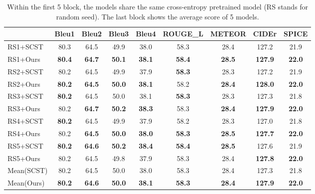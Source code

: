 \documentclass[11pt,a4paper]{article}
\begin{document}
\begin{table*}[htbp]\small
  \centering
    \begin{tabular}{lcccccccc}
          & \multicolumn{1}{l}{Bleu1} & \multicolumn{1}{l}{Bleu2} & \multicolumn{1}{l}{Bleu3} & \multicolumn{1}{l}{Bleu4} & \multicolumn{1}{l}{ROUGE\_L} & \multicolumn{1}{l}{METEOR} & \multicolumn{1}{l}{CIDEr} & \multicolumn{1}{l}{SPICE} \\
    \midrule
    RS1+SCST & 80.3  & 64.5  & 49.9  & 38.0  & 58.3  & 28.4  & 127.2 & 21.9 \\
    RS1+Ours & \textbf{80.4} & \textbf{64.7} & \textbf{50.1} & \textbf{38.1} & \textbf{58.4} & \textbf{28.5} & \textbf{127.9} & \textbf{22.0} \\
    \midrule
    RS2+SCST & 80.2  & 64.5  & 49.9  & 37.9  & \textbf{58.3} & 28.3  & 127.2 & 21.9 \\
    RS2+Ours & \textbf{80.2} & \textbf{64.5} & \textbf{50.0} & \textbf{38.1} & 58.2  & \textbf{28.4} & \textbf{128.0} & \textbf{22.0} \\
    \midrule
    RS3+SCST & \textbf{80.2} & 64.5  & 50.0  & 38.1  & \textbf{58.3} & 28.3  & 127.3 & 21.8 \\
    RS3+Ours & 80.2  & \textbf{64.7} & \textbf{50.2} & \textbf{38.3} & 58.3  & \textbf{28.4} & \textbf{127.9} & \textbf{22.0} \\
    \midrule
    RS4+SCST & \textbf{80.2} & 64.5  & 49.9  & 37.9  & 58.2  & 28.3  & 127.0 & 21.8 \\
    RS4+Ours & 80.2  & \textbf{64.5} & \textbf{50.0} & \textbf{38.0} & \textbf{58.3} & \textbf{28.5} & \textbf{127.7} & \textbf{22.0} \\
    \midrule
    RS5+SCST & \textbf{80.2} & \textbf{64.6} & \textbf{50.2} & \textbf{38.4} & \textbf{58.4} & \textbf{28.5} & 127.6 & 21.9 \\
    RS5+Ours & 80.2  & 64.5  & 49.8  & 37.9  & 58.3  & 28.4  & \textbf{127.8} & \textbf{22.0} \\
    \midrule
    Mean(SCST) & 80.2  & 64.5  & 50.0  & 38.0  & 58.3  & 28.4  & 127.3 & 21.8 \\
    Mean(Ours) & \textbf{80.2} & \textbf{64.6} & \textbf{50.0} & \textbf{38.1} & \textbf{58.3} & \textbf{28.4} & \textbf{127.9} & \textbf{22.0} \\
    \bottomrule
    \end{tabular}\caption{Within the first 5 block, the models share the same cross-entropy pretrained model (RS stands for random seed). The last block shows the average score of 5 models.}
  \label{tab:multipleruns}\end{table*}
\end{document}
